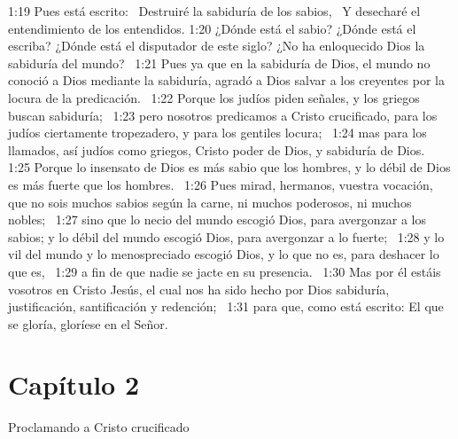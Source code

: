 1:19 Pues está escrito:  
Destruiré la sabiduría de los sabios,  
Y desecharé el entendimiento de los entendidos. 
1:20 ¿Dónde está el sabio? ¿Dónde está el escriba? ¿Dónde está el disputador de este siglo? ¿No ha enloquecido Dios la sabiduría del mundo?  
1:21 Pues ya que en la sabiduría de Dios, el mundo no conoció a Dios mediante la sabiduría, agradó a Dios salvar a los creyentes por la locura de la predicación.  
1:22 Porque los judíos piden señales, y los griegos buscan sabiduría;  
1:23 pero nosotros predicamos a Cristo crucificado, para los judíos ciertamente tropezadero, y para los gentiles locura;  
1:24 mas para los llamados, así judíos como griegos, Cristo poder de Dios, y sabiduría de Dios.  
1:25 Porque lo insensato de Dios es más sabio que los hombres, y lo débil de Dios es más fuerte que los hombres.  
1:26 Pues mirad, hermanos, vuestra vocación, que no sois muchos sabios según la carne, ni muchos poderosos, ni muchos nobles;  
1:27 sino que lo necio del mundo escogió Dios, para avergonzar a los sabios; y lo débil del mundo escogió Dios, para avergonzar a lo fuerte;  
1:28 y lo vil del mundo y lo menospreciado escogió Dios, y lo que no es, para deshacer lo que es,  
1:29 a fin de que nadie se jacte en su presencia.  
1:30 Mas por él estáis vosotros en Cristo Jesús, el cual nos ha sido hecho por Dios sabiduría, justificación, santificación y redención;  
1:31 para que, como está escrito: El que se gloría, gloríese en el Señor. 
\section*{Capítulo 2}
Proclamando a Cristo crucificado  

